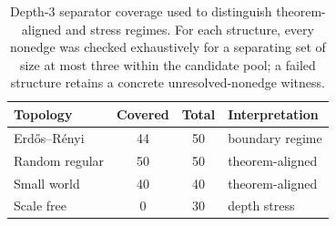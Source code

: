 \begin{table}[t]
\centering
\small
\renewcommand{\arraystretch}{1.13}
\setlength{\tabcolsep}{5pt}
\begin{tabularx}{\textwidth}{@{}L{1.25}C{0.72}C{0.72}L{1.31}@{}}
\toprule
Topology & Covered & Total & Interpretation \\
\midrule
Erd\H{o}s--R\'enyi & 44 & 50 & boundary regime \\
Random regular & 50 & 50 & theorem-aligned \\
Small world & 40 & 40 & theorem-aligned \\
Scale free & 0 & 30 & depth stress \\
\bottomrule
\end{tabularx}
\caption{Depth-$3$ separator coverage used to distinguish theorem-aligned and stress regimes. For each structure, every nonedge was checked exhaustively for a separating set of size at most three within the candidate pool; a failed structure retains a concrete unresolved-nonedge witness.}
\label{tab:depth-scope}
\end{table}
